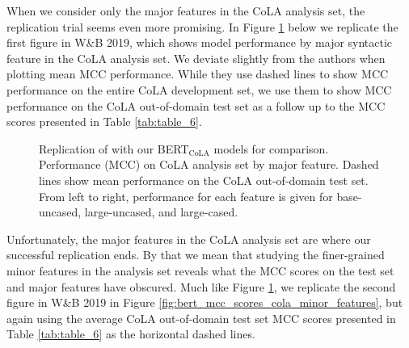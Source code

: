 When we consider only the major features in the CoLA analysis set, the replication trial seems even more promising.  In Figure \ref{fig:bert_mcc_scores_cola_major_features} below we replicate the first figure in W\&B 2019, which shows model performance by major syntactic feature in the CoLA analysis set.  We deviate slightly from the authors when plotting mean MCC performance.  While they use dashed lines to show MCC performance on the entire CoLA development set, we use them to show MCC performance on the CoLA out-of-domain test set as a follow up to the MCC scores presented in Table \ref{tab:table_6}.

\begin{figure}[h]
    \caption[BERT$_\mathrm{CoLA}$ MCC scores on CoLA Analysis Set by major feature]{Replication of \citet{warstadt2019linguistic} with our BERT$_\mathrm{CoLA}$ models for comparison.  Performance (MCC) on CoLA analysis set by major feature.  Dashed lines show mean performance on the CoLA out-of-domain test set.  From left to right, performance for each feature is given for base-uncased, large-uncased, and large-cased.}
    \label{fig:bert_mcc_scores_cola_major_features}
\end{figure}

Unfortunately, the major features in the CoLA analysis set are where our successful replication ends.  By that we mean that studying the finer-grained minor features in the analysis set reveals what the MCC scores on the test set and major features have obscured.  Much like Figure \ref{fig:bert_mcc_scores_cola_major_features}, we replicate the second figure in W\&B 2019 in Figure \ref{fig:bert_mcc_scores_cola_minor_features}, but again using the average CoLA out-of-domain test set MCC scores presented in Table \ref{tab:table_6} as the horizontal dashed lines.

